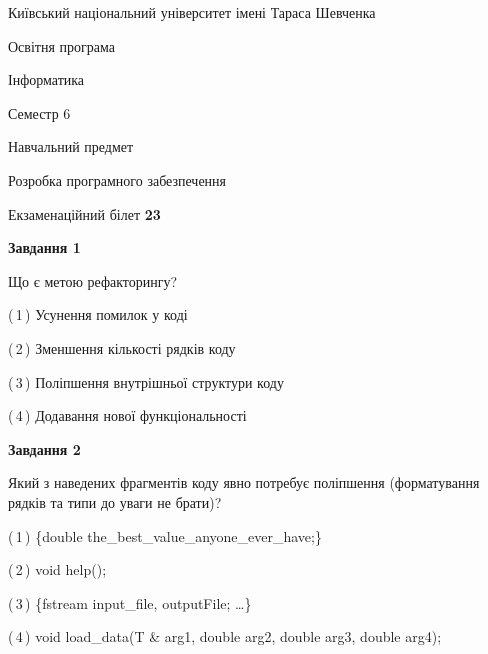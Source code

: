 \documentclass[10pt, ukrainian]{article}
\begin{document}
{{\begin {small}\par
{ \center  Київський національний університет імені Тараса Шевченка \par}
{\parbox {5 cm}{Освітня програма \hfill}{\parbox {7 cm}{Інформатика \hfill}}\parbox {6 cm}{\hfill Семестр 6}}\par
{\parbox {5 cm} {Навчальний предмет \hfill}\parbox {7 cm}{Розробка програмного забезпечення \hfill}\parbox {6cm}{\hfill}\par}\vspace{-7pt} \end{small}}{\center Екзаменаційний білет \No \textbf
{ 23 }\par}}
{
\begin {large}
{\begin {center}\textbf{Завдання 1}\end {center}}\par
Що є метою рефакторингу?\par
\vspace{2mm}



(\,1\,) Усунення помилок у коді%



(\,2\,) Зменшення кількості рядків коду%



(\,3\,) Поліпшення внутрішньої структури коду%



(\,4\,) Додавання нової функціональності%


{\begin {center}\textbf{Завдання 2}\end {center}}\par
Який з наведених фрагментів коду явно потребує поліпшення (форматування рядків та типи до уваги не брати)?\par
\vspace{2mm}



(\,1\,) \{double the\_best\_value\_anyone\_ever\_have;\} %



(\,2\,) void help();%



(\,3\,) \{fstream input\_file, outputFile; …\}%



(\,4\,) void load\_data(T \& arg1, double arg2, double arg3, double arg4); %



\end{large}}
\end{document}
